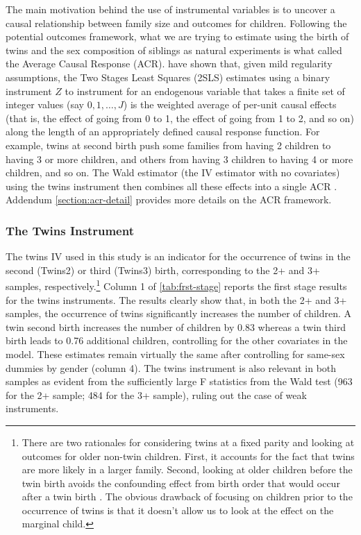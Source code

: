 The main motivation behind the use of instrumental variables is to uncover a causal relationship between family size and outcomes for children. Following the potential outcomes framework, what we are trying to estimate using the birth of twins and the sex composition of siblings as natural experiments is what \textcite{Angrist1995} called the Average Causal Response (ACR). \textcite{Angrist1995} have shown that, given mild regularity assumptions, the Two Stages Least Squares (2SLS) estimates using a binary instrument $ Z $ to instrument for an endogenous variable that takes a finite set of integer values  (say $ 0, 1, \dots, J $) is the weighted average of per-unit causal effects (that is, the effect of going from 0 to 1, the effect of going from 1 to 2, and so on) along the length of an appropriately defined causal response function. For example, twins at second birth push some families from having 2 children to having 3 or more children, and others from having 3 children to having 4 or more children, and so on.  The Wald estimator (the IV estimator with no covariates) using the twins instrument then combines all these
effects into a single ACR \parencite{Angrist2009}. Addendum \ref{section:acr-detail} provides more details on the ACR framework. 

\subsubsection{The Twins Instrument}

The twins IV used in this study is an indicator for the occurrence of twins in the second (Twins2) or third (Twins3) birth, corresponding to the 2+ and 3+ samples, respectively.\footnote{There are two rationales for considering twins at a fixed parity and looking at outcomes for older non-twin children. First, it accounts for the fact that twins are more likely in a larger family. Second, looking at older children before the twin birth avoids the confounding effect from birth order that would occur after a twin birth \parencite{Black2010}. The obvious drawback of focusing on children prior to the occurrence of twins is that it doesn't allow us to look at the effect on the marginal child.} Column 1 of \autoref{tab:frst-stage} reports the first stage results for the twins instruments. The results clearly show that, in both the 2+ and 3+ samples, the occurrence of twins significantly increases the number of children. A twin second birth increases the number of children by 0.83 whereas a twin third birth leads to 0.76 additional children, controlling for the other covariates in the model. These estimates remain virtually the same after controlling for same-sex dummies by gender (column 4).  The twins instrument is also relevant in both samples as evident from the sufficiently large F statistics from the Wald test (963 for the 2+ sample; 484 for the 3+ sample), ruling out the case of weak instruments.

